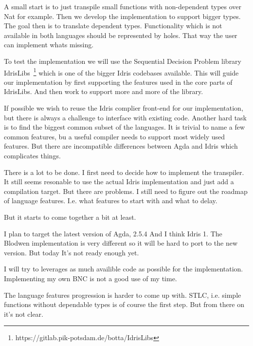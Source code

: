 \documentclass{scrartcl}
\begin{document}
A small start is to just transpile small functions with non-dependent types
over Nat for example. Then we develop the implementation to support bigger
types. The goal then is to translate dependent types.  Functionality which is
not available in both languages should be represented by holes. That way the
user can implement whats missing.

To test the implementation we will use the Sequential Decision Problem library
IdrisLibs~\footnote{https://gitlab.pik-potsdam.de/botta/IdrisLibs} which is one
of the bigger Idris codebases available. This will guide our implementation by
first supporting the features used in the core parts of IdrisLibs. And then
work to support more and more of the library.

If possible we wish to reuse the Idris complier front-end for our
implementation, but there is always a challenge to interface with existing
code.  Another hard task is to find the biggest common subset of the languages.
It is trivial to name a few common features, bu a useful compiler needs to
support most widely used features. But there are incompatible differences
between Agda and Idris which complicates things.






There is a lot to be done. I first need to decide how to implement the
transpiler. It still seems resonable to use the actual Idris implementation and
just add a compilation target. But there are problems. I still need to figure
out the roadmap of language features. I.e. what features to start with and what
to delay.

But it starts to come together a bit at least.

I plan to target the latest version of Agda, 2.5.4
And I think Idris 1. The Blodwen implementation is very different so it will be
hard to port to the new version. But today It's not ready enough yet.

I will try to leverages as much availible code as possible for the
implementation. Implementing my own BNC is not a good use of my time.

The language features progression is harder to come up with. STLC, i.e. simple
functions without dependable types is of course the first step. But from there
on it's not clear.






\end{document}
